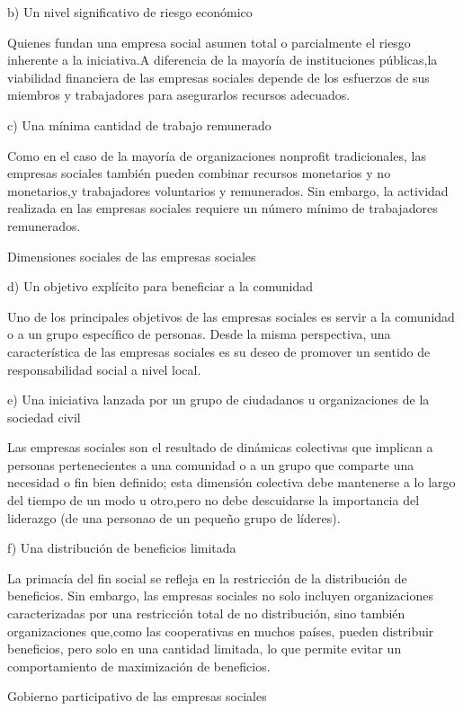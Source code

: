 \documentclass[11pt]{article}
\begin{document}
b)  Un  nivel significativo de  riesgo económico 

Quienes fundan una   empresa social asumen total o parcialmente el  riesgo inherente a la iniciativa.A diferencia de  la mayoría de   instituciones públicas,la viabilidad financiera de  las  empresas sociales  depende de  los  esfuerzos de  sus   miembros y  trabajadores para asegurarlos  recursos adecuados.

c)  Una mínima cantidad de  trabajo remunerado

Como en  el  caso de  la mayoría de  organizaciones nonprofit tradicionales, las  empresas sociales también pueden combinar recursos monetarios y no  monetarios,y trabajadores voluntarios y remunerados. Sin  embargo, la actividad realizada en  las  empresas sociales requiere un  número mínimo de trabajadores remunerados. 


Dimensiones sociales de las empresas sociales

d)  Un  objetivo explícito para beneficiar a la comunidad 

Uno de  los  principales objetivos de  las  empresas sociales es  servir a la comunidad o a un  grupo específico de  personas. Desde la misma perspectiva, una   característica de  las  empresas sociales es  su  deseo de  promover un  sentido de  responsabilidad social a nivel local.

e)  Una iniciativa lanzada por   un  grupo de  ciudadanos u organizaciones de  la sociedad civil

Las   empresas sociales son   el  resultado de  dinámicas colectivas que   implican a personas pertenecientes a una   comunidad o a un  grupo que   comparte una   necesidad o fin bien definido; esta dimensión colectiva debe mantenerse a lo largo del   tiempo de  un  modo u otro,pero no  debe descuidarse la importancia del   liderazgo (de  una   personao de  un  pequeño grupo de  líderes).

f) Una distribución de  beneficios limitada

La  primacía del   fin  social se  refleja en  la restricción de  la distribución de  beneficios. Sin  embargo, las  empresas sociales no  solo incluyen organizaciones caracterizadas por   una   restricción total de  no distribución, sino también organizaciones que,como las  cooperativas en  muchos países, pueden distribuir beneficios, pero solo en una cantidad limitada, lo que   permite evitar un  comportamiento de  maximización de  beneficios.


Gobierno participativo de las empresas sociales
\end{document}
